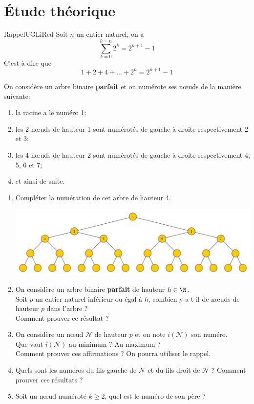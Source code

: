 \documentclass[a4paper,12pt,french]{book}
\begin{document}



    \section*{\'Etude théorique}

    \begin{encadrecolore}{Rappel}{UGLiRed}
        Soit $n$ un entier naturel, on a $$\sum_{k=0}^{k=n}2^k = 2^{n+1}-1$$
        C'est à dire que
        $$1+2+4+\ldots+2^n=2^{n+1}-1$$
    \end{encadrecolore}

    On considère un arbre binaire \textbf{parfait} et on numérote ses n\oe uds de la manière suivante:
    \begin{enumerate}[--]
        \item la racine a le numéro 1;
        \item les 2 n\oe uds de hauteur 1 sont numérotés de gauche à droite respectivement 2 et 3;
        \item les 4 n\oe uds de hauteur 2 sont numérotés de gauche à droite respectivement 4, 5, 6 et 7;
        \item et ainsi de suite.
    \end{enumerate}

    \begin{enumerate}[\bfseries 1.]
        \item Compléter la numération de cet arbre de hauteur 4.

        \begin{center}
            \includegraphics[width=16cm]{img/arbre3}
        \end{center}
        \item On considère un arbre binaire \textbf{parfait} de hauteur $h\in \N$.\\
        Soit $p$ un entier naturel inférieur ou égal à $h$, combien y a-t-il de n\oe uds de hauteur $p$ dans l'arbre ? \\
        Comment prouver ce résultat ?
        \item On considère un n\oe ud $\mathcal{N}$ de hauteur $p$ et on note $i\left(\mathcal{N}\right)$ son numéro.\\
        Que vaut $i\left(\mathcal{N}\right)$ au minimum ? Au maximum ?\\
        Comment prouver ces affirmations ? On pourra utiliser le rappel.
        \item Quels sont les numéros du fils gauche de $\mathcal{N}$ et du fils droit de $\mathcal{N}$ ? Comment prouver ces résultats ?
        \item Soit un n\oe ud numéroté $k\geqslant 2$, quel est le numéro de son père ?
    \end{enumerate}
\end{document}
